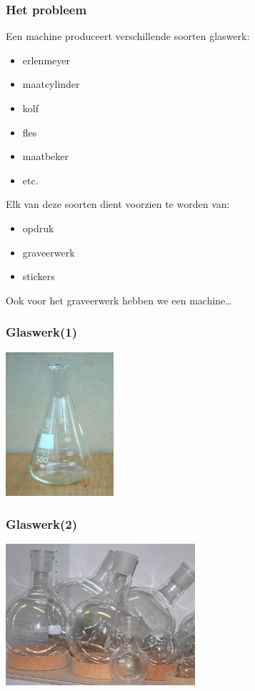 \documentclass{beamer}
\begin{document}
\begin{frame}
\frametitle{Het probleem}
Een machine produceert verschillende soorten glaswerk:
\begin{itemize}
\item erlenmeyer
\item maatcylinder
\item kolf
\item fles
\item maatbeker
\item etc.
\end{itemize}\pause
Elk van deze soorten dient voorzien te worden van:
\begin{itemize}
\item opdruk
\item graveerwerk
\item stickers
\end{itemize}\pause
Ook voor het graveerwerk hebben we een machine\ldots
\end{frame}

\begin{frame}
\frametitle{Glaswerk(1)}
\begin{center}
\includegraphics[width=4cm]{erlenm}
\end{center}
\end{frame}

\begin{frame}
\frametitle{Glaswerk(2)}
\begin{center}
\includegraphics[width=7cm]{kolf}
\end{center}
\end{frame}
\end{document}

